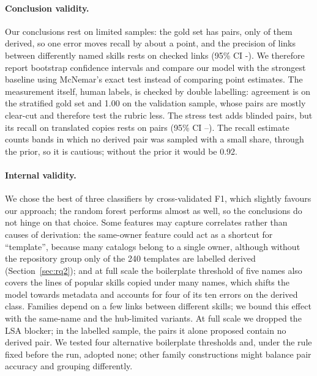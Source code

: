 \documentclass[sigconf,screen]{acmart}
\begin{document}
\paragraph{Conclusion validity.} Our conclusions rest on limited samples: the gold set has \ResGoldPairs{} pairs, only \ResGoldDerived{} of them derived, so one error moves recall by about a point, and the precision of links between differently named skills rests on \ResValNDiffName{} checked links (95\% CI \ResValPrecDiffNameLo-\ResValPrecDiffNameHi). We therefore report bootstrap confidence intervals and compare our model with the strongest baseline using McNemar's exact test instead of comparing point estimates. The measurement itself, human labels, is checked by double labelling: agreement is \ResKappaThree{} on the stratified gold set and 1.00 on the validation sample, whose pairs are mostly clear-cut and therefore test the rubric less. The stress test adds \ResSTPairs{} blinded pairs, but its recall on translated copies rests on \ResSTCrossDerived{} pairs (95\% CI \ResSTCrossRecallLo--\ResSTCrossRecallHi). The recall estimate counts bands in which no derived pair was sampled with a small share, through the prior, so it is cautious; without the prior it would be 0.92.
 
\paragraph{Internal validity.} We chose the best of three classifiers by cross-validated F1, which slightly favours our approach; the random forest performs almost as well, so the conclusions do not hinge on that choice. Some features may capture correlates rather than causes of derivation: the same-owner feature could act as a shortcut for ``template'', because many catalogs belong to a single owner, although without the repository group only \ResNoRepoTemplateAsDerived{} of the 240 templates are labelled derived (Section~\ref{sec:rq2}); and at full scale the boilerplate threshold of five names also covers the lines of popular skills copied under many names, which shifts the model towards metadata and accounts for four of its ten errors on the derived class. Families depend on a few links between different skills; we bound this effect with the same-name and the hub-limited variants. At full scale we dropped the LSA blocker; in the labelled sample, the pairs it alone proposed contain no derived pair. We tested four alternative boilerplate thresholds and, under the rule fixed before the run, adopted none; other family constructions might balance pair accuracy and grouping differently.
 
\end{document}
